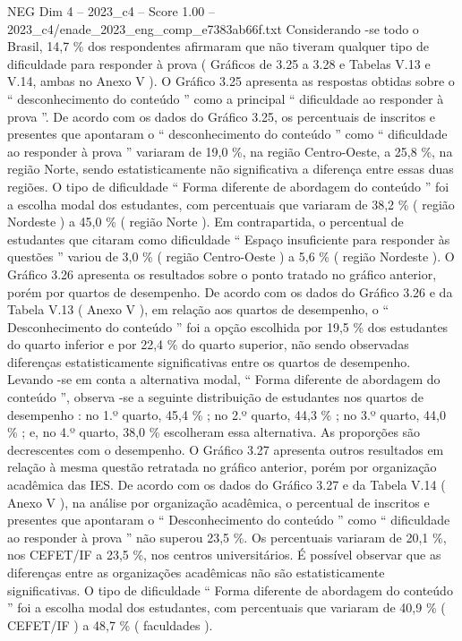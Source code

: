 \begin{textsample}{NEG Dim 4 – 2023\_c4 – Score 1.00 – 2023\_c4/enade\_2023\_eng\_comp\_e7383ab66f.txt}
Considerando -se todo o Brasil, 14,7 \% dos respondentes afirmaram que não tiveram qualquer tipo de dificuldade para responder à prova ( Gráficos de 3.25 a 3.28 e Tabelas V.13 e V.14, ambas no Anexo V ).
O Gráfico 3.25 apresenta as respostas obtidas sobre o “ desconhecimento do conteúdo ” como a principal “ dificuldade ao responder à prova ”.
De acordo com os dados do Gráfico 3.25, os percentuais de inscritos e presentes que apontaram o “ desconhecimento do conteúdo ” como “ dificuldade ao responder à prova ” variaram de 19,0 \%, na região Centro-Oeste, a 25,8 \%, na região Norte, sendo estatisticamente não significativa a diferença entre essas duas regiões.
O tipo de dificuldade “ Forma diferente de abordagem do conteúdo ” foi a escolha modal dos estudantes, com percentuais que variaram de 38,2 \% ( região Nordeste ) a 45,0 \% ( região Norte ).
Em contrapartida, o percentual de estudantes que citaram como dificuldade “ Espaço insuficiente para responder às questões ” variou de 3,0 \% ( região Centro-Oeste ) a 5,6 \% ( região Nordeste ).
O Gráfico 3.26 apresenta os resultados sobre o ponto tratado no gráfico anterior, porém por quartos de desempenho.
De acordo com os dados do Gráfico 3.26 e da Tabela V.13 ( Anexo V ), em relação aos quartos de desempenho, o “ Desconhecimento do conteúdo ” foi a opção escolhida por 19,5 \% dos estudantes do quarto inferior e por 22,4 \% do quarto superior, não sendo observadas diferenças estatisticamente significativas entre os quartos de desempenho.
Levando -se em conta a alternativa modal, “ Forma diferente de abordagem do conteúdo ”, observa -se a seguinte distribuição de estudantes nos quartos de desempenho : no 1.º quarto, 45,4 \% ; no 2.º quarto, 44,3 \% ; no 3.º quarto, 44,0 \% ; e, no 4.º quarto, 38,0 \% escolheram essa alternativa.
As proporções são decrescentes com o desempenho.
O Gráfico 3.27 apresenta outros resultados em relação à mesma questão retratada no gráfico anterior, porém por organização acadêmica das IES.
De acordo com os dados do Gráfico 3.27 e da Tabela V.14 ( Anexo V ), na análise por organização acadêmica, o percentual de inscritos e presentes que apontaram o “ Desconhecimento do conteúdo ” como “ dificuldade ao responder à prova ” não superou 23,5 \%.
Os percentuais variaram de 20,1 \%, nos CEFET/IF a 23,5 \%, nos centros universitários.
É possível observar que as diferenças entre as organizações acadêmicas não são estatisticamente significativas.
O tipo de dificuldade “ Forma diferente de abordagem do conteúdo ” foi a escolha modal dos estudantes, com percentuais que variaram de 40,9 \% ( CEFET/IF ) a 48,7 \% ( faculdades ).

\end{textsample}
